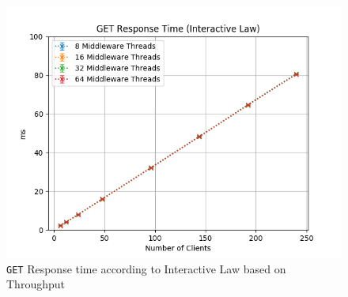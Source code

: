 \documentclass[11pt,a4paper]{article}
\begin{document}
%
\begin{figure}[H]
	\centering
	\captionsetup{width=0.4\textwidth}
    \begin{minipage}{0.5\textwidth}
        \includegraphics[width=\textwidth]{../illustrations/plots/2_1_one_middleware/0-1/middleware_interactive_get_rt_ms.png}
        \caption{\texttt{GET} Response time according to Interactive Law based on Throughput}
        \label{fig:one_middleware_get_rt_it}
    \end{minipage}\hfill
\end{figure}
%
\end{document}
